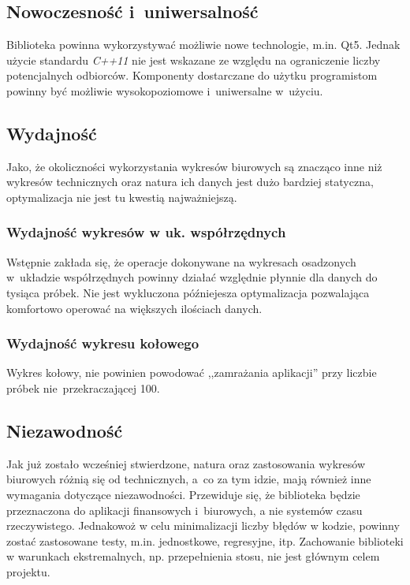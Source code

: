 \documentclass[11pt,twoside,a4paper,final]{article}
\begin{document}
\subsection{Nowoczesność i~uniwersalność}
Biblioteka powinna wykorzystywać możliwie nowe technologie, m.in. Qt5. Jednak użycie standardu \textit{C++11} nie jest wskazane ze względu na ograniczenie liczby potencjalnych odbiorców. Komponenty dostarczane do użytku programistom powinny być możliwie wysokopoziomowe i~uniwersalne w~użyciu.

\subsection{Wydajność}
Jako, że okoliczności wykorzystania wykresów biurowych są znacząco inne niż wykresów technicznych oraz natura ich danych jest dużo bardziej statyczna, optymalizacja nie jest tu kwestią najważniejszą. 

\subsubsection{Wydajność wykresów w uk. współrzędnych}
Wstępnie zakłada się, że operacje dokonywane na wykresach osadzonych w~układzie współrzędnych powinny działać względnie płynnie dla danych do tysiąca próbek. Nie jest wykluczona późniejesza optymalizacja
pozwalająca komfortowo operować na większych ilościach danych.

\subsubsection{Wydajność wykresu kołowego}
Wykres kołowy, nie powinien powodować ,,zamrażania aplikacji'' przy liczbie próbek nie~przekraczającej 100. 

\subsection{Niezawodność}
Jak już zostało wcześniej stwierdzone, natura oraz zastosowania wykresów biurowych różnią się od technicznych, a~co za tym idzie, mają również inne wymagania dotyczące niezawodności. Przewiduje się, że biblioteka będzie przeznaczona do aplikacji finansowych i~biurowych, a nie systemów czasu rzeczywistego. Jednakowoż w celu minimalizacji liczby błędów w kodzie, powinny zostać zastosowane testy, m.in. jednostkowe, regresyjne, itp. Zachowanie biblioteki w warunkach ekstremalnych, np. przepełnienia stosu, nie jest głównym celem projektu.
\end{document}
